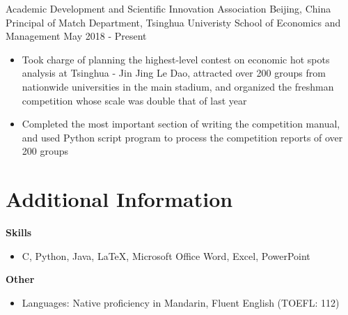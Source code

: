 \documentclass{resumeEN}
\begin{document}
    \Experience
    {Academic Development and Scientific Innovation Association}
    {Beijing, China}
    {Principal of Match Department, Tsinghua Univeristy School of Economics and Management}
    {May 2018 - Present}

    \begin{itemize}
        \item Took charge of planning the highest-level contest on economic hot spots analysis at Tsinghua - Jin Jing Le Dao, attracted over 200 groups from nationwide universities in the main stadium, and organized the freshman competition whose scale was double that of last year
        \item Completed the most important section of writing the competition manual, and used Python script program to process the competition reports of over 200 groups
    \end{itemize}

    \section{Additional Information}
    \textbf{Skills}
    \begin{itemize}
        \item C, Python, Java, {\LaTeX}, Microsoft Office Word, Excel, PowerPoint
    \end{itemize}
    \textbf{Other}
    \begin{itemize}
        \item Languages: Native proficiency in Mandarin, Fluent English (TOEFL: 112)
    \end{itemize}
\end{document}
